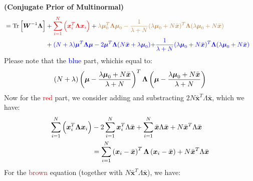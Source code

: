 \begin{remark}{\textbf{(Conjugate Prior of Multinormal)}}
\begin{equation*}
\begin{aligned}
        &= \begin{aligned}[t]
            \operatorname{Tr}\Big[\boldsymbol W^{-1}\boldsymbol \Lambda \Big] &+ \textcolor{red}{\sum^N_{i=1}\Big(\boldsymbol x_i^T\boldsymbol \Lambda\boldsymbol x_i\Big)} + \textcolor{brown}{\lambda\boldsymbol \mu_0^T\boldsymbol \Lambda\boldsymbol \mu_0 - \frac{1}{\lambda + N}(\lambda\boldsymbol \mu_0 + N\bar{\boldsymbol x})^T\boldsymbol \Lambda (\lambda\boldsymbol \mu_0 + N\bar{\boldsymbol x})} \\
            &+ \textcolor{blue}{(N+\lambda)\boldsymbol \mu^T\boldsymbol \Lambda\boldsymbol \mu - 2\boldsymbol \mu^T\boldsymbol \Lambda(N\bar{\boldsymbol x} + \lambda\boldsymbol\mu_0)} \textcolor{blue}{+ \frac{1}{\lambda + N}(\lambda\boldsymbol \mu_0 + N\bar{\boldsymbol x})^T\boldsymbol \Lambda (\lambda\boldsymbol \mu_0 + N\bar{\boldsymbol x})}  \\        
        \end{aligned}
    \end{aligned}
    \end{equation*}
    Please note that the \textcolor{blue}{blue} part, whichis equal to:
    \begin{equation*}
        (N+\lambda)\left( \boldsymbol \mu - \frac{\lambda\boldsymbol \mu_0 + N\bar{\boldsymbol x}}{\lambda+N} \right)^T\boldsymbol\Lambda\left( \boldsymbol \mu - \frac{\lambda\boldsymbol \mu_0 + N\bar{\boldsymbol x}}{\lambda+N} \right)
    \end{equation*}
    Now for the \textcolor{red}{red} part, we consider adding and substracting $2N\bar{\boldsymbol x}^T\Lambda\bar{\boldsymbol x}$, which we have:
    \begin{equation*}
    \begin{aligned}
        \sum^N_{i=1}\Big(\boldsymbol x_i^T\boldsymbol \Lambda\boldsymbol x_i\Big)&- 2\sum^N_{i=1}\boldsymbol x^T_i\Lambda\bar{\boldsymbol x} + \sum^N_{i=1}\bar{\boldsymbol x}\Lambda\bar{\boldsymbol x} + N\bar{\boldsymbol x}^T\Lambda\bar{\boldsymbol x} \\ 
        &= \sum^N_{i=1}\left( \boldsymbol x_i - \bar{\boldsymbol x} \right)^T\boldsymbol\Lambda\left( \boldsymbol x_i - \bar{\boldsymbol x} \right) + N\bar{\boldsymbol x}^T\Lambda\bar{\boldsymbol x}
    \end{aligned}
    \end{equation*}
    For the \textcolor{brown}{brown} equation (together with $N\bar{\boldsymbol x}^T\Lambda\bar{\boldsymbol x}$), we have:
    \begin{equation*}
    \begin{aligned}

\end{aligned}
\end{equation*}
\end{remark}
